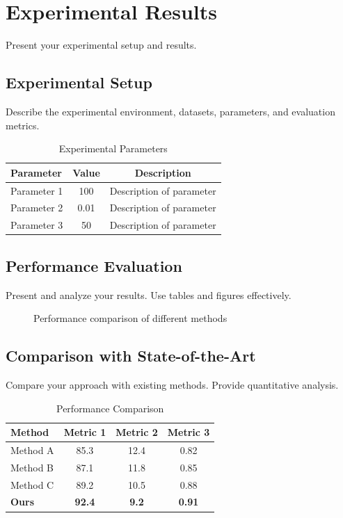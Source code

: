 \section{Experimental Results}
\label{sec:results}

Present your experimental setup and results.

\subsection{Experimental Setup}
\label{subsec:setup}

Describe the experimental environment, datasets, parameters, and evaluation metrics.

\begin{table}[h]
\centering
\caption{Experimental Parameters}
\label{tab:parameters}
\begin{tabular}{lcc}
\toprule
Parameter & Value & Description \\
\midrule
Parameter 1 & 100 & Description of parameter \\
Parameter 2 & 0.01 & Description of parameter \\
Parameter 3 & 50 & Description of parameter \\
\bottomrule
\end{tabular}
\end{table}

\subsection{Performance Evaluation}
\label{subsec:performance}

Present and analyze your results. Use tables and figures effectively.

\begin{figure}[h]
\centering
\caption{Performance comparison of different methods}
\label{fig:performance}
\end{figure}

\subsection{Comparison with State-of-the-Art}
\label{subsec:comparison}

Compare your approach with existing methods. Provide quantitative analysis.

\begin{table}[h]
\centering
\caption{Performance Comparison}
\label{tab:comparison}
\begin{tabular}{lccc}
\toprule
Method & Metric 1 & Metric 2 & Metric 3 \\
\midrule
Method A & 85.3 & 12.4 & 0.82 \\
Method B & 87.1 & 11.8 & 0.85 \\
Method C & 89.2 & 10.5 & 0.88 \\
\textbf{Ours} & \textbf{92.4} & \textbf{9.2} & \textbf{0.91} \\
\bottomrule
\end{tabular}
\end{table}

